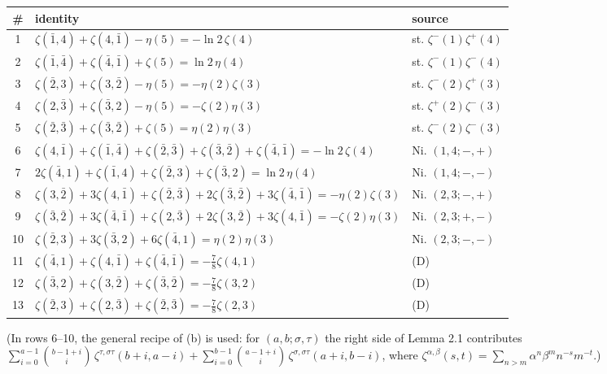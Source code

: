 \documentclass[11pt]{article}
\theoremstyle{remark}
\begin{document}
\begin{center}
\begin{tabular}{|c|l|l|}
\hline
\# & identity & source \\
\hline
1 & $\zeta(\bar1,4)+\zeta(4,\bar1)-\eta(5)=-\ln2\,\zeta(4)$ & st. $\zeta^{-}(1)\zeta^{+}(4)$ \\
2 & $\zeta(\bar1,\bar4)+\zeta(\bar4,\bar1)+\zeta(5)=\ln2\,\eta(4)$ & st. $\zeta^{-}(1)\zeta^{-}(4)$ \\
3 & $\zeta(\bar2,3)+\zeta(3,\bar2)-\eta(5)=-\eta(2)\zeta(3)$ & st. $\zeta^{-}(2)\zeta^{+}(3)$ \\
4 & $\zeta(2,\bar3)+\zeta(\bar3,2)-\eta(5)=-\zeta(2)\eta(3)$ & st. $\zeta^{+}(2)\zeta^{-}(3)$ \\
5 & $\zeta(\bar2,\bar3)+\zeta(\bar3,\bar2)+\zeta(5)=\eta(2)\eta(3)$ & st. $\zeta^{-}(2)\zeta^{-}(3)$ \\
6 & $\zeta(4,\bar1)+\zeta(\bar1,\bar4)+\zeta(\bar2,\bar3)+\zeta(\bar3,\bar2)+\zeta(\bar4,\bar1)=-\ln2\,\zeta(4)$ & Ni. $(1,4;-,+)$ \\
7 & $2\zeta(\bar4,1)+\zeta(\bar1,4)+\zeta(\bar2,3)+\zeta(\bar3,2)=\ln2\,\eta(4)$ & Ni. $(1,4;-,-)$ \\
8 & $\zeta(3,\bar2)+3\zeta(4,\bar1)+\zeta(\bar2,\bar3)+2\zeta(\bar3,\bar2)+3\zeta(\bar4,\bar1)=-\eta(2)\zeta(3)$ & Ni. $(2,3;-,+)$ \\
9 & $\zeta(\bar3,\bar2)+3\zeta(\bar4,\bar1)+\zeta(2,\bar3)+2\zeta(3,\bar2)+3\zeta(4,\bar1)=-\zeta(2)\eta(3)$ & Ni. $(2,3;+,-)$ \\
10 & $\zeta(\bar2,3)+3\zeta(\bar3,2)+6\zeta(\bar4,1)=\eta(2)\eta(3)$ & Ni. $(2,3;-,-)$ \\
11 & $\zeta(\bar4,1)+\zeta(4,\bar1)+\zeta(\bar4,\bar1)=-\tfrac78\zeta(4,1)$ & (D) \\
12 & $\zeta(\bar3,2)+\zeta(3,\bar2)+\zeta(\bar3,\bar2)=-\tfrac78\zeta(3,2)$ & (D) \\
13 & $\zeta(\bar2,3)+\zeta(2,\bar3)+\zeta(\bar2,\bar3)=-\tfrac78\zeta(2,3)$ & (D) \\
\hline
\end{tabular}
\end{center}

(In rows 6--10, the general recipe of (b) is used: for $(a,b;\sigma,\tau)$ the right side of Lemma 2.1
contributes $\sum_{i=0}^{a-1}\binom{b-1+i}{i}\,\zeta^{\tau,\sigma\tau}(b+i,a-i)
+\sum_{i=0}^{b-1}\binom{a-1+i}{i}\,\zeta^{\sigma,\sigma\tau}(a+i,b-i)$, where
$\zeta^{\alpha,\beta}(s,t)=\sum_{n>m}\alpha^n\beta^m n^{-s}m^{-t}$.)
\end{document}
